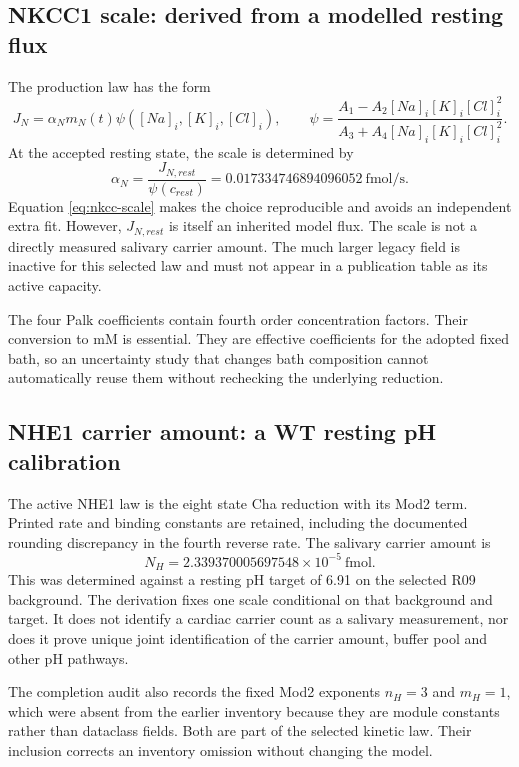 \documentclass[11pt,a4paper]{article}
\begin{document}
\subsection{NKCC1 scale: derived from a modelled resting flux}
The production law has the form
\[
 J_N=\alpha_Nm_N(t)\psi([Na]_i,[K]_i,[Cl]_i),\qquad
 \psi=\frac{A_1-A_2[Na]_i[K]_i[Cl]_i^2}
 {A_3+A_4[Na]_i[K]_i[Cl]_i^2}.
\]
At the accepted resting state, the scale is determined by
\begin{equation}
 \alpha_N=\frac{J_{N,rest}}{\psi(c_{rest})}
 =0.017334746894096052\ \mathrm{fmol/s}.
 \label{eq:nkcc-scale}
\end{equation}
Equation \cref{eq:nkcc-scale} makes the choice reproducible and avoids an independent extra fit. However, $J_{N,rest}$ is itself an inherited model flux. The scale is not a directly measured salivary carrier amount. The much larger legacy field  is inactive for this selected law and must not appear in a publication table as its active capacity.

The four Palk coefficients contain fourth order concentration factors. Their conversion to mM is essential. They are effective coefficients for the adopted fixed bath, so an uncertainty study that changes bath composition cannot automatically reuse them without rechecking the underlying reduction.

\subsection{NHE1 carrier amount: a WT resting pH calibration}
The active NHE1 law is the eight state Cha reduction with its Mod2 term. Printed rate and binding constants are retained, including the documented rounding discrepancy in the fourth reverse rate. The salivary carrier amount is
\[
 N_H=2.339370005697548\times10^{-5}\ \mathrm{fmol}.
\]
This was determined against a resting pH target of 6.91 on the selected R09 background. The derivation fixes one scale conditional on that background and target. It does not identify a cardiac carrier count as a salivary measurement, nor does it prove unique joint identification of the carrier amount, buffer pool and other pH pathways.

The completion audit also records the fixed Mod2 exponents $n_H=3$ and $m_H=1$, which were absent from the earlier inventory because they are module constants rather than dataclass fields. Both are part of the selected kinetic law. Their inclusion corrects an inventory omission without changing the model.
\end{document}
